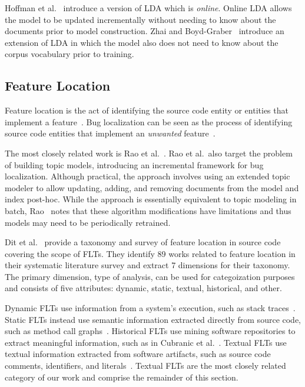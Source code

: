 Hoffman et al.~\cite{Hoffman-etal:2010} introduce a version of LDA which is
\emph{online}.  Online LDA allows the model to be updated incrementally without
needing to know about the documents prior to model construction.  Zhai and
Boyd-Graber~\cite{Zhai-Boyd-Graber:2013} introduce an extension of LDA in which
the model also does not need to know about the corpus vocabulary prior to
training.


\subsection{Feature Location}

Feature location is the act of identifying the source code entity or entities
that implement a feature~\cite{Rajlich-Wilde:2002}.  Bug localization can be
seen as the process of identifying source code entities that implement an
\emph{unwanted} feature~\cite{Lukins-etal:2010}.

The most closely related work is Rao et al.~\cite{Rao-etal:2013}. Rao et al.\
also target the problem of building topic models, introducing an incremental
framework for bug localization.  Although practical, the approach involves using
an extended topic modeler to allow updating, adding, and removing documents from
the model and index post-hoc.  While the approach is essentially equivalent to
topic modeling in batch, Rao~\cite{Rao:2013} notes that these algorithm
modifications have limitations and thus models may need to be periodically
retrained.

Dit et al.~\cite{Dit-etal:2011} provide a taxonomy and survey of feature
location in source code covering the scope of FLTs.  They identify 89 works
related to feature location in their systematic literature survey and extract
7 dimensions for their taxonomy.  The primary dimension, type of analysis, can
be used for categoization purposes and consists of five attributes: dynamic,
static, textual, historical, and other.

Dynamic FLTs use information from a system's execution, such as stack
traces~\cite{Moreno-etal:2014}.  Static FLTs instead use semantic information
extracted directly from source code, such as method call
graphs~\cite{Saul-etal:2007}.  Historical FLTs use mining software repositories
to extract meaningful information, such as in Cubranic et
al.~\cite{Cubranic-etal:2005}.  Textual FLTs use textual information extracted
from software artifacts, such as source code comments, identifiers, and
literals~\cite{Biggers-etal:2014}. Textual FLTs are the most closely related
category of our work and comprise the remainder of this section.

